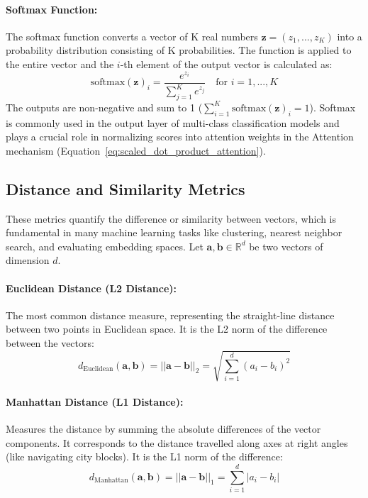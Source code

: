 \paragraph{Softmax Function:}
The softmax function converts a vector of K real numbers \( \bm{z} = (z_1, ..., z_K) \) into a probability distribution consisting of K probabilities. The function is applied to the entire vector and the \( i \)-th element of the output vector is calculated as:
\begin{equation}
  \text{softmax}(\bm{z})_i = \frac{e^{z_i}}{\sum_{j=1}^K e^{z_j}} \quad \text{for } i = 1, ..., K
\end{equation}
The outputs are non-negative and sum to 1 (\( \sum_{i=1}^K \text{softmax}(\bm{z})_i = 1 \)). Softmax is commonly used in the output layer of multi-class classification models and plays a crucial role in normalizing scores into attention weights in the Attention mechanism (Equation~\ref{eq:scaled_dot_product_attention}).

\subsection{Distance and Similarity Metrics}
\label{subsec:distance_metrics}
These metrics quantify the difference or similarity between vectors, which is fundamental in many machine learning tasks like clustering, nearest neighbor search, and evaluating embedding spaces. Let \( \bm{a}, \bm{b} \in \mathbb{R}^d \) be two vectors of dimension \( d \).

\paragraph{Euclidean Distance (L2 Distance):}
\label{eq:euclidean_distance}
The most common distance measure, representing the straight-line distance between two points in Euclidean space. It is the L2 norm of the difference between the vectors:
\begin{equation}
  d_{\text{Euclidean}}(\bm{a}, \bm{b}) = ||\bm{a} - \bm{b}||_2 = \sqrt{\sum_{i=1}^d (a_i - b_i)^2}
\end{equation}

\paragraph{Manhattan Distance (L1 Distance):}
Measures the distance by summing the absolute differences of the vector components. It corresponds to the distance travelled along axes at right angles (like navigating city blocks). It is the L1 norm of the difference:
\begin{equation}
  d_{\text{Manhattan}}(\bm{a}, \bm{b}) = ||\bm{a} - \bm{b}||_1 = \sum_{i=1}^d |a_i - b_i|
\end{equation}

